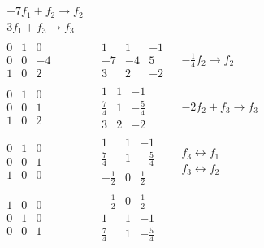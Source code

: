 \begin{align*}
\begin{array}{l|lr}
\begin{matrix}
				-7f_1+f_2\rightarrow f_2\\
				3f_1+f_3\rightarrow f_3
			\end{matrix}\\
			\hline
			\begin{matrix}
				0&1&0\\
				0&0&-4\\
				1&0&2
			\end{matrix} & \begin{matrix}
				1&1&-1\\
				-7&-4&5\\
				3&2&-2
			\end{matrix} & \begin{matrix}
				-\frac{1}{4}f_2\rightarrow f_2
			\end{matrix}\\
			\hline
			\begin{matrix}
				0&1&0\\
				0&0&1\\
				1&0&2
			\end{matrix} & \begin{matrix}
				1&1&-1\\
				\frac{7}{4}&1&-\frac{5}{4}\\
				3&2&-2
			\end{matrix} & \begin{matrix}
				-2f_2+f_3\rightarrow f_3
			\end{matrix}\\
			\hline
			\begin{matrix}
				0&1&0\\
				0&0&1\\
				1&0&0
			\end{matrix} & \begin{matrix}
				1&1&-1\\
				\frac{7}{4}&1&-\frac{5}{4}\\
				-\frac{1}{2}&0&\frac{1}{2}
			\end{matrix} & \begin{matrix}
				f_3\leftrightarrow f_1\\
				f_3\leftrightarrow f_2
			\end{matrix}\\
			\hline
			\begin{matrix}
				1&0&0\\
				0&1&0\\
				0&0&1
			\end{matrix} & \begin{matrix}
				-\frac{1}{2}&0&\frac{1}{2}\\
				1&1&-1\\
				\frac{7}{4}&1&-\frac{5}{4}
			\end{matrix} & \begin{matrix}
				\
			\end{matrix}
		\end{array}
	\end{align*}
